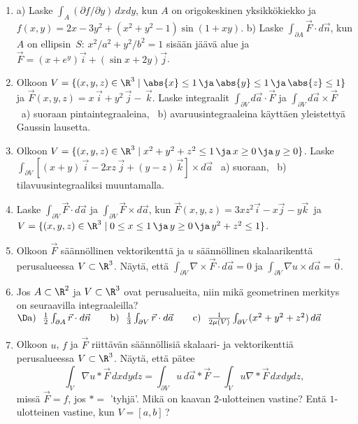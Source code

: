 \Harj
\begin{enumerate}

\item 
a) Laske $\int_A (\partial f/\partial y)\,dxdy$, kun $A$ on origokeskinen yksikkökiekko ja
$f(x,y)=2x-3y^2+(x^2+y^2-1)\sin(1+xy)$. \vspace{1mm}\newline
b) Laske $\int_{\partial A} \vec F \cdot d\vec n$, kun $A$ on ellipsin $\,S:\,x^2/a^2+y^2/b^2=1$
sisään jäävä alue ja $\vec F=(x+e^y)\vec i+(\sin x+2y)\vec j$.

\item 
Olkoon $V=\{(x,y,z)\in\R^3 \mid \abs{x}\le 1\,\ja\,\abs{y}\le 1\,\ja\,\abs{z}\le 1\}$ ja
$\vec F(x,y,z)=x\,\vec i + y^2\,\vec j-\,\vec k$. Laske integraalit 
$\int_{\partial V} d\vec a\cdot\vec F$ ja $\int_{\partial V} d\vec a\times\vec F$ \ 
a) suoraan pintaintegraaleina, \ b) avaruusintegraaleina käyttäen yleistettyä Gaussin lausetta.

\item 
Olkoon $V=\{(x,y,z)\in \R^3 \mid x^2+y^2+z^2\le 1\,\ja\,x\ge 0\,\ja\,y\ge 0\}$.
Laske $\int_{\partial V} [(x+y)\,\vec i -2xz\,\vec j+(y-z)\,\vec k]\times d \vec a$ \ 
a) suoraan, \ b) tilavuusintegraaliksi muuntamalla. 

\item
Laske $\int_{\partial V} \vec F \cdot d\vec a$ ja $\int_{\partial V} \vec F \times d\vec a$, 
kun $\vec F(x,y,z)=3xz^2\vec i-x\vec j-y\vec k\,$ ja
$V=\{(x,y,z)\in\R^3 \mid 0 \le x \le 1 \,\ja\, y \ge 0 \,\ja\, y^2+z^2 \le 1\}$.

\item
Olkoon $\vec F$ säännöllinen vektorikenttä ja $u$ säännöllinen skalaarikenttä perusalueessa
$V\subset\R^3$. Näytä, että $\int_{\partial V} \nabla\times\vec F \cdot d\vec a=0$ ja
$\int_{\partial V} \nabla u\times d\vec a=\vec 0$. 

\item 
Jos $A\subset \R^2$ ja $V\subset \R^3$ ovat perusalueita, niin mikä geometrinen merkitys on
seuraavilla integraaleilla? \vspace{1mm}\newline
$\D
\text{a)}\ \ \frac{1}{2} \int_{\partial A} \vec r \cdot d\vec n \qquad
\text{b)}\ \ \frac{1}{3} \int_{\partial V}\vec r \cdot d\vec a \qquad
\text{c)}\ \ \frac{1}{2\mu(V)} \int_{\partial V} (x^2+y^2+z^2)\,d\vec a$

\item \label{H-pot-1: osittaisintegrointi}
Olkoon $u$, $f$ ja $\vec F$ riittävän säännöllisiä skalaari- ja vektorikenttiä perus\-alueessa
$V\subset\R^3$. Näytä, että pätee
\[
\int_V \nabla u\ast\vec F\,dxdydz = \int_{\partial V} u\,d\vec a\ast\vec F -
\int_V u\nabla\ast\vec F\,dxdydz,
\]
missä $\vec F=f$, jos $\ast=$ 'tyhjä'. Mikä on kaavan $2$-ulotteinen vastine? Entä 
$1$-ulotteinen vastine, kun $V=[a,b]\,$?


\end{enumerate}
